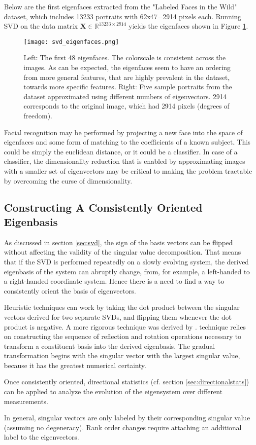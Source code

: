 Below are the first eigenfaces extracted from the "Labeled Faces in the Wild" dataset, which includes 13233 portraits with 62x47=2914 pixels each. Running SVD on the data matrix $\mathbf{X} \in \mathbb{R}^{13233\times 2914}$ yields the eigenfaces shown in Figure \ref{fig:svd_eigenfaces}.

\begin{figure}
\centering
    \texttt{[image: svd\_eigenfaces.png]}
    \caption{Left: The first 48 eigenfaces. The colorscale is consistent across the images. As can be expected, the eigenfaces seem to have an ordering from more general features, that are highly prevalent in the dataset, towards more specific features. Right: Five sample portraits from the dataset approximated using different numbers of eigenvectors. 2914 corresponds to the original image, which had 2914 pixels (degrees of freedom).}
    \label{fig:svd_eigenfaces}
\end{figure}

Facial recognition may be performed by projecting a new face into the space of eigenfaces and some form of matching to the coefficients of a known subject. This could be simply the euclidean distance, or it could be a classifier. In case of a classifier, the dimensionality reduction that is enabled by approximating images with a smaller set of eigenvectors may be critical to making the problem tractable by overcoming the curse of dimensionality.


\subsection{Constructing A Consistently Oriented Eigenbasis}
	
As discussed in section \ref{sec:svd}, the sign of the basis vectors can be flipped without affecting the validity of the singular value decomposition. That means that if the SVD is performed repeatedly on a slowly evolving system, the derived eigenbasis of the system can abruptly change, from, for example, a left-handed to a right-handed coordinate system. Hence there is a need to find a way to consistently orient the basis of eigenvectors. 

Heuristic techniques can work by taking the dot product between the singular vectors derived for two separate SVDs, and flipping them whenever the dot product is negative. A more rigorous technique was derived by .  technique relies on constructing the sequence of reflection and rotation operations necessary to transform a constituent basis into the derived eigenbasis. The gradual transformation begins with the singular vector with the largest singular value, because it has the greatest numerical certainty. 

Once consistently oriented, directional statistics (cf. section \ref{sec:directionalstats}) can be applied to analyze the evolution of the eigensystem over different measurements. 

In general, singular vectors are only labeled by their corresponding singular value (assuming no degeneracy). Rank order changes require attaching an additional label to the eigenvectors.